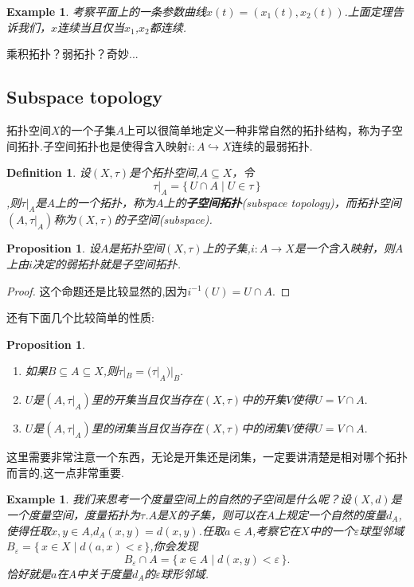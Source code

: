 \documentclass{article}
\newtheorem{proposition}[theorem]{Proposition}
\newtheorem{example}[theorem]{Example}
\newtheorem{definition}[theorem]{Definition}
\newcommand*{\xfunc}[4]{{#2}\colon{#3}{#1}{#4}}
\newcommand*{\func}[3]{\xfunc{\to}{#1}{#2}{#3}}
\newcommand\Set[2]{\{\,#1\mid#2\,\}} %
\begin{document}
\begin{example}
考察平面上的一条参数曲线$x(t)=(x_1(t),x_2(t))$.上面定理告诉我们，$x$连续当且仅当$x_1$,$x_2$都连续.
\end{example}

乘积拓扑？弱拓扑？奇妙...

\newpage
\subsection{Subspace topology}

拓扑空间$X$的一个子集$A$上可以很简单地定义一种非常自然的拓扑结构，称为子空间拓扑.子空间拓扑也是使得含入映射$i \colon A \hookrightarrow X$连续的最弱拓扑.

\begin{definition}
设$(X,\tau)$是个拓扑空间,$A \subseteq X$，令\[\tau|_A=\Set{U \cap A}{U \in \tau}\],则$\tau|_A$是$A$上的一个拓扑，称为$A$上的\textbf{子空间拓扑}(subspace topology)，而拓扑空间$(A,\tau|_A)$称为$(X,\tau)$的子空间(subspace).
\end{definition}

\begin{proposition}
设$A$是拓扑空间$(X,\tau)$上的子集,$\func{i}{A}{X}$是一个含入映射，则$A$上由$i$决定的弱拓扑就是子空间拓扑.
\end{proposition}

\begin{proof}
这个命题还是比较显然的,因为$i^{-1}(U)=U \cap A$.
\end{proof}

还有下面几个比较简单的性质:

\begin{proposition}
\begin{enumerate}
	\item 如果$B \subseteq A \subseteq X$,则$\tau|_B = (\tau|_A)|_B.$
	\item $U$是$(A,\tau|_A)$里的开集当且仅当存在$(X,\tau)$中的开集$V$使得$U = V \cap A.$
	\item $U$是$(A,\tau|_A)$里的闭集当且仅当存在$(X,\tau)$中的闭集$V$使得$U = V \cap A.$
\end{enumerate}
\end{proposition}

这里需要非常注意一个东西，无论是开集还是闭集，一定要讲清楚是相对哪个拓扑而言的,这一点非常重要.

\begin{example}
我们来思考一个度量空间上的自然的子空间是什么呢？设$(X,d)$是一个度量空间，度量拓扑为$\tau$.$A$是$X$的子集，则可以在$A$上规定一个自然的度量$d_A$,使得任取$x,y \in A$,$d_A(x,y)=d(x,y)$.任取$a \in A$,考察它在$X$中的一个$\varepsilon$球型邻域$B_\varepsilon=\Set{x \in X}{d(a,x) < \varepsilon}$,你会发现\[B_\varepsilon \cap A = \Set{x \in A}{d(x,y) < \varepsilon}.\]恰好就是$a$在$A$中关于度量$d_A$的$\varepsilon$球形邻域.	
\end{example}
\end{document}
